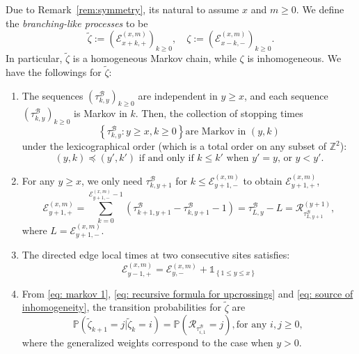 \documentclass[twoside,12pt, a4paper]{article}
\numberwithin{equation}{section}
\theoremstyle{remark}
\begin{document}
	Due to Remark~\ref{rem:symmetry}, its natural to assume $x$ and $m \ge 0$. We define the \textit{branching-like processes} to be
	\[
	\tilde{\zeta} := \left(\mathcal{E}^{(x,m)}_{x+k,+} \right)_{k\geq 0}, \quad
	\zeta := \left(\mathcal{E}^{(x,m)}_{x-k,-} \right)_{k\geq 0}
	.\]
	In particular, $\tilde{\zeta}$ is a homogeneous Markov chain, while $\zeta$ is inhomogeneous. We have the followings for 	$\tilde{\zeta}$:
	\begin{enumerate}
		\item The sequences $(\tau^{\mathcal{B}}_{k,y})_{k\geq 0} $ are independent in $y \geq x$, and each sequence $\left(\tau^{\mathcal{B}}_{k,y}\right)_{k\geq 0} $ is Markov in $k$. Then, the collection of stopping times
		\begin{equation}\label{eq: markov 1} 
			\left\{\tau^{\mathcal{B}}_{k,y}: y\geq x, k\geq 0 \right\} \mbox{are Markov in $(y,k)$}
		\end{equation}
		under the lexicographical order (which is a total order on any subset of $\mathbb{Z}^2$): 
		\begin{equation*}\label{eq: lexicographical order}
			(y,k) \preceq (y',k')  \mbox{ if and only if }
			k \leq k'   \mbox{ when $y' = y$, or } 
			y <y'. 
		\end{equation*} 
		
		\item For any $y\geq x$, we only need $\tau^{\mathcal{B}}_{k,y+1}$ for $k\leq \mathcal{E}^{(x,m)}_{y+1,-}$ to obtain $\mathcal{E}^{(x,m)}_{y+1,+}$,
		\begin{equation} \label{eq: recursive formula for upcrossings}
			\mathcal{E}_{y+1,+}^{(x,m)}	=  \sum_{k= 0 }^{\mathcal{E}_{y+1,-}^{(x,m)}-1}	\left(\tau^{\mathcal{B}}_{k+1,y+1}-\tau^{\mathcal{B}}_{k,y+1}-1 \right) = \tau^{\mathcal{B}}_{ L,y } - L = \mathcal{R}^{(y + 1)}_{\tau^{\mathcal{B}}_{ L,y+1 }},
		\end{equation}
		where $L = \mathcal{E}_{y+1,-}^{(x,m)}$.
		
		\item The directed edge local times at two consecutive sites satisfies:
		\begin{equation}\label{eq: source of inhomogeneity}
			\mathcal{E}_{y-1,+}^{(x,m)} = \mathcal{E}_{y,-}^{(x,m)} + \mathbb{1}_{ \left\{ 1\leq y \leq x \right\} }
		\end{equation}
		
		\item  From \eqref{eq: markov 1}, \eqref{eq: recursive formula for upcrossings} and \eqref{eq: source of inhomogeneity}, the transition probabilities for $\tilde{\zeta}$ are 
		\begin{equation}\label{eq: transition prob on positive}
			\mathbb{P}\left(\tilde{\zeta}_{k+1}=j \vert \tilde{\zeta}_k =i  \right) = 
			\mathbb{P}\left( \mathcal{R}_{\tau_{i,1}^{\mathcal{B}}} = j \right), \mbox{for any $i,j\geq 0$, } 
		\end{equation} 
		where the generalized weights correspond to the case when $y>0$.
	\end{enumerate}
	
\end{document}

